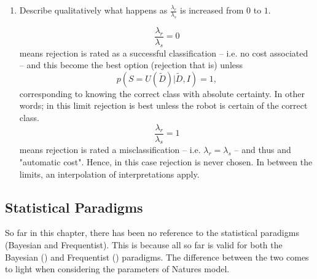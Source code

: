 \begin{example}
\begin{enumerate}
		\item Describe qualitatively what happens as $\frac{\lambda_r}{\lambda_s}$ is increased from $0$ to $1$.\newline
		
		\begin{equation}
			\frac{\lambda_r}{\lambda_s}=0
		\end{equation}
		means rejection is rated as a successful classification -- i.e. no cost associated -- and this become the best option (rejection that is) unless
		\begin{equation}
			p(S=U(\tilde{D})|\tilde{D},I)=1,
		\end{equation}
		corresponding to knowing the correct class with absolute certainty. In other words; in this limit rejection is best unless the robot is certain of the correct class. 
		\begin{equation}
			\frac{\lambda_r}{\lambda_s}=1
		\end{equation} 
		means rejection is rated a misclassification -- i.e. $\lambda_r=\lambda_s$ -- and thus and "automatic cost". Hence, in this case rejection is never chosen. In between the limits, an interpolation of interpretations apply.
	\end{enumerate}
\end{example}

\subsection{Statistical Paradigms}
So far in this chapter, there has been no reference to the statistical paradigms (Bayesian and Frequentist). This is because all so far is valid for both the Bayesian () and Frequentist () paradigms. The difference between the two comes to light when considering the parameters of Natures model.  
